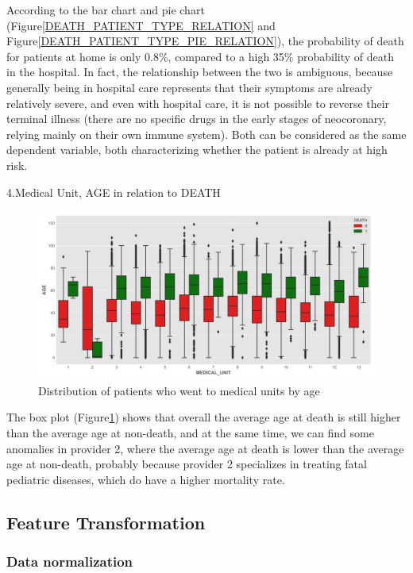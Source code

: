\documentclass[
  journal=medium,
  manuscript=Report,
  year=2023,
  volume=37,
]{cup-journal}
\begin{document}
According to the bar chart and pie chart (Figure\ref{DEATH_PATIENT_TYPE_RELATION} and Figure\ref{DEATH_PATIENT_TYPE_PIE_RELATION}), the probability of death for patients at home is only 0.8\%, compared to a high 35\% probability of death in the hospital. In fact, the relationship between the two is ambiguous, because generally being in hospital care represents that their symptoms are already relatively severe, and even with hospital care, it is not possible to reverse their terminal illness (there are no specific drugs in the early stages of neocoronary, relying mainly on their own immune system). Both can be considered as the same dependent variable, both characterizing whether the patient is already at high risk.

4.Medical Unit, AGE in relation to DEATH

\begin{figure}[!hbtp]
    \centering
    \includegraphics[width=0.9\linewidth]{pic/Distribution of patients who went to medical units by age.png}
    \caption{Distribution of patients who went to medical units by age}
    \label{Distribution of patients who went to medical units by age}
\end{figure}

The box plot (Figure\ref{Distribution of patients who went to medical units by age}) shows that overall the average age at death is still higher than the average age at non-death, and at the same time, we can find some anomalies in provider 2, where the average age at death is lower than the average age at non-death, probably because provider 2 specializes in treating fatal pediatric diseases, which do have a higher mortality rate.

\subsection{Feature Transformation}

\subsubsection{Data normalization}
\end{document}
